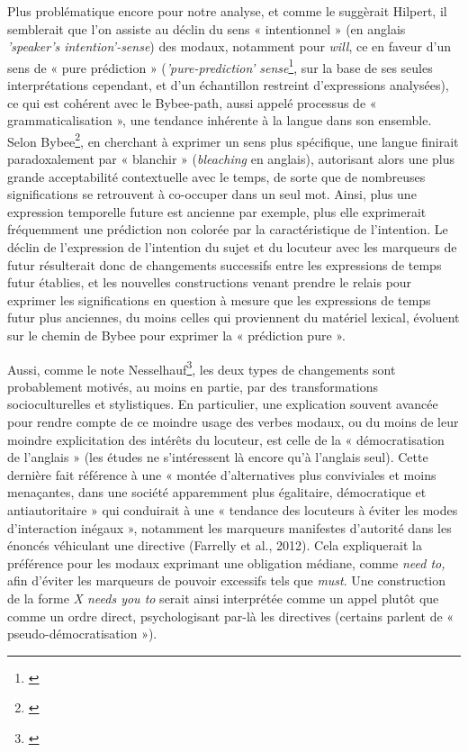 Plus problématique encore pour notre analyse, et comme le suggèrait Hilpert, il semblerait que l’on assiste au déclin du sens « intentionnel » (en anglais \textit{'speaker’s intention’-sense}) des modaux, notamment pour \textit{will}, ce en faveur d'un sens de « pure prédiction » (\textit{'pure-prediction’ sense}\footnote{\cite{nesselhauf_mechanisms_2012}}, sur la base de ses seules interprétations cependant, et d’un échantillon restreint d’expressions analysées), ce qui est cohérent avec le Bybee-path, aussi appelé processus de « grammaticalisation », une tendance inhérente à la langue dans son ensemble. Selon Bybee\footnote{\cite{bybee_evolution_1995}}, en cherchant à exprimer un sens plus spécifique, une langue finirait paradoxalement par « blanchir » (\textit{bleaching} en anglais), autorisant alors une plus grande acceptabilité contextuelle avec le temps, de sorte que de nombreuses significations se retrouvent à co-occuper dans un seul mot. Ainsi, plus une expression temporelle future est ancienne par exemple, plus elle exprimerait fréquemment une prédiction non colorée par la caractéristique de l'intention. Le déclin de l'expression de l'intention du sujet et du locuteur avec les marqueurs de futur résulterait donc de changements successifs entre les expressions de temps futur établies, et les nouvelles constructions venant prendre le relais pour exprimer les significations en question à mesure que les expressions de temps futur plus anciennes, du moins celles qui proviennent du matériel lexical, évoluent sur le chemin de Bybee pour exprimer la « prédiction pure ». 

Aussi, comme le note Nesselhauf\footnote{\cite{nesselhauf_mechanisms_2012}}, les deux types de changements sont probablement motivés, au moins en partie, par des transformations socioculturelles et stylistiques. En particulier, une explication souvent avancée pour rendre compte de ce moindre usage des verbes modaux, ou du moins de leur moindre explicitation des intérêts du locuteur, est celle de la « démocratisation de l'anglais » (les études ne s'intéressent là encore qu'à l’anglais seul). Cette dernière fait référence à une « montée d'alternatives plus conviviales et moins menaçantes, dans une société apparemment plus égalitaire, démocratique et antiautoritaire » qui conduirait à une « tendance des locuteurs à éviter les modes d'interaction inégaux », notamment les marqueurs manifestes d'autorité dans les énoncés véhiculant une directive (Farrelly et al., 2012). Cela expliquerait la préférence pour les modaux exprimant une obligation médiane, comme \textit{need to,} afin d'éviter les marqueurs de pouvoir excessifs tels que \textit{must}. Une construction de la forme \textit{X needs you to} serait ainsi interprétée comme un appel plutôt que comme un ordre direct, psychologisant par-là les directives (certains parlent de « pseudo-démocratisation »).

